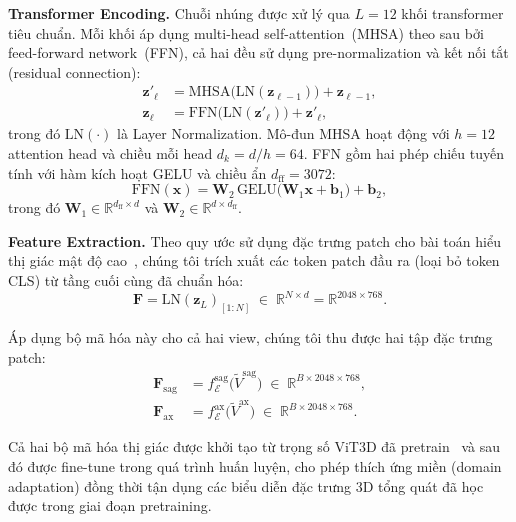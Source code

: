 \textbf{Transformer Encoding.} Chuỗi nhúng được xử lý qua $L = 12$ khối transformer tiêu chuẩn. Mỗi khối áp dụng multi-head self-attention~(MHSA) theo sau bởi feed-forward network~(FFN), cả hai đều sử dụng pre-normalization và kết nối tắt (residual connection):
\begin{align}
\mathbf{z}'_\ell &= \text{MHSA}\!\big(\text{LN}(\mathbf{z}_{\ell-1})\big) + \mathbf{z}_{\ell-1}, \label{eq:mhsa} \\[4pt]
\mathbf{z}_\ell  &= \text{FFN}\!\big(\text{LN}(\mathbf{z}'_\ell)\big) + \mathbf{z}'_\ell, \label{eq:ffn_block}
\end{align}
trong đó $\text{LN}(\cdot)$ là Layer Normalization. Mô-đun MHSA hoạt động với $h = 12$ attention head và chiều mỗi head $d_k = d/h = 64$. FFN gồm hai phép chiếu tuyến tính với hàm kích hoạt GELU và chiều ẩn $d_{\text{ff}} = 3072$:
\begin{equation}
\text{FFN}(\mathbf{x}) = \mathbf{W}_2\, \text{GELU}\!\big(\mathbf{W}_1 \mathbf{x} + \mathbf{b}_1\big) + \mathbf{b}_2,
\label{eq:ffn}
\end{equation}
trong đó $\mathbf{W}_1 \in \mathbb{R}^{d_{\text{ff}} \times d}$ và $\mathbf{W}_2 \in \mathbb{R}^{d \times d_{\text{ff}}}$.

\textbf{Feature Extraction.} Theo quy ước sử dụng đặc trưng patch cho bài toán hiểu thị giác mật độ cao~\cite{bai2024m3d, chen2024reg2rg}, chúng tôi trích xuất các token patch đầu ra (loại bỏ token CLS) từ tầng cuối cùng đã chuẩn hóa:
\begin{equation}
\mathbf{F} = \text{LN}(\mathbf{z}_L)_{[1{:}N]} \;\in\; \mathbb{R}^{N \times d} = \mathbb{R}^{2048 \times 768}.
\label{eq:feature_extract}
\end{equation}

Áp dụng bộ mã hóa này cho cả hai view, chúng tôi thu được hai tập đặc trưng patch:
\begin{align}
\mathbf{F}_{\text{sag}} &= f_{\mathcal{E}}^{\text{sag}}\!\big(\tilde{V}^{\text{sag}}\big) \;\in\; \mathbb{R}^{B \times 2048 \times 768}, \label{eq:feat_sag} \\[2pt]
\mathbf{F}_{\text{ax}}  &= f_{\mathcal{E}}^{\text{ax}}\!\big(\tilde{V}^{\text{ax}}\big)   \;\in\; \mathbb{R}^{B \times 2048 \times 768}. \label{eq:feat_ax}
\end{align}

Cả hai bộ mã hóa thị giác được khởi tạo từ trọng số ViT3D đã pretrain~\cite{bai2024m3d} và sau đó được fine-tune trong quá trình huấn luyện, cho phép thích ứng miền (domain adaptation) đồng thời tận dụng các biểu diễn đặc trưng 3D tổng quát đã học được trong giai đoạn pretraining.


